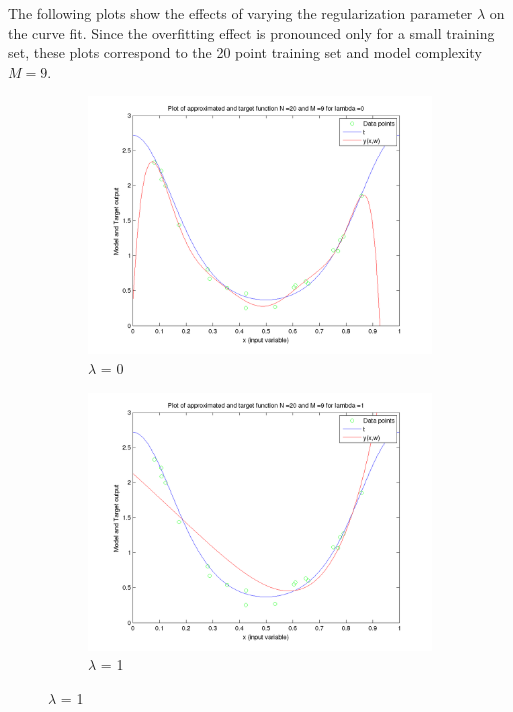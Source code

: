\documentclass{article}
\makeatletter
\renewcommand\paragraph{\@startsection{paragraph}{4}{\z@}%
            {-2.5ex\@plus -1ex \@minus -.25ex}%
            {1.25ex \@plus .25ex}%
            {\normalfont\normalsize\bfseries}}
\makeatother
\begin{document}
\begin{flushleft}
The following plots show the effects of varying the regularization parameter $\lambda$ on the curve fit. Since the overfitting effect is pronounced only for a small training set, these plots correspond to the 20 point training set and model complexity $M = 9$.
\end{flushleft}
\begin{figure}[H]

\begin{subfigure}{.5\textwidth}
\centering
\includegraphics[width=\linewidth]{Varyinglambda_N20M9lambda0}
\caption{$\lambda$ = 0}
\end{subfigure}
\begin{subfigure}{.5\textwidth}
\includegraphics[width=\linewidth]{Varyinglambda_N20M9lambda1}
\caption{$\lambda$ = 1}
\end{subfigure}



\end{figure}
\end{document}
